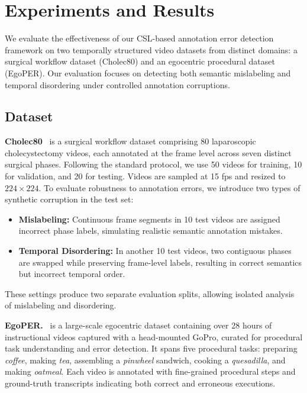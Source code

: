 \documentclass{article}
\theoremstyle{plain}
\theoremstyle{definition}
\theoremstyle{remark}
\begin{document}
\vspace{-0.8em}
\section{Experiments and Results}
We evaluate the effectiveness of our CSL-based annotation error detection framework on two temporally structured video datasets from distinct domains: a surgical workflow dataset (Cholec80) and an egocentric procedural dataset (EgoPER). Our evaluation focuses on detecting both semantic mislabeling and temporal disordering under controlled annotation corruptions.

\vspace{-0.4em}
\subsection{Dataset}
\textbf{Cholec80}~\cite{surgical_endonet} is a surgical workflow dataset comprising 80 laparoscopic cholecystectomy videos, each annotated at the frame level across seven distinct surgical phases. Following the standard protocol, we use 50 videos for training, 10 for validation, and 20 for testing. Videos are sampled at 15 fps and resized to $224 \times 224$.
To evaluate robustness to annotation errors, we introduce two types of synthetic corruption in the test set:
\begin{itemize}
    \vspace{-0.8em}
    \item \textbf{Mislabeling:} Continuous frame segments in 10 test videos are assigned incorrect phase labels, simulating realistic semantic annotation mistakes.
    \vspace{-0.4em}
    \item \textbf{Temporal Disordering:} In another 10 test videos, two contiguous phases are swapped while preserving frame-level labels, resulting in correct semantics but incorrect temporal order.
\end{itemize}
\vspace{-0.4em}
These settings produce two separate evaluation splits, allowing isolated analysis of mislabeling and disordering.

\textbf{EgoPER.}~\cite{EgoPER} is a large-scale egocentric dataset containing over 28 hours of instructional videos captured with a head-mounted GoPro, curated for procedural task understanding and error detection. It spans five procedural tasks: preparing \textit{coffee}, making \textit{tea}, assembling a \textit{pinwheel} sandwich, cooking a \textit{quesadilla}, and making \textit{oatmeal}. Each video is annotated with fine-grained procedural steps and ground-truth transcripts indicating both correct and erroneous executions.
\end{document}
